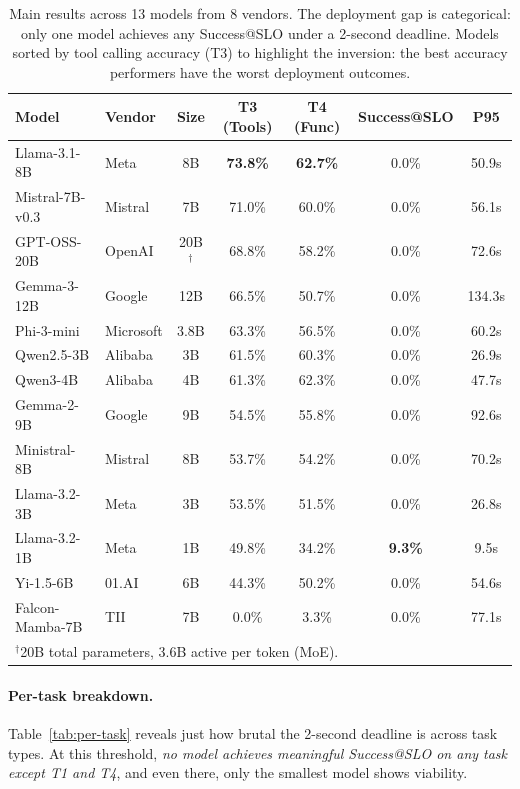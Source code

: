 \documentclass[11pt]{article}
\begin{document}
\begin{table}[t]
\centering
\caption{Main results across 13 models from 8 vendors.  The deployment gap is categorical: only one model achieves any Success@SLO under a 2-second deadline.  Models sorted by tool calling accuracy (T3) to highlight the inversion: the best accuracy performers have the worst deployment outcomes.}
\label{tab:main-results}
\small
\begin{tabular}{llccccc}
\toprule
\textbf{Model} & \textbf{Vendor} & \textbf{Size} & \textbf{T3 (Tools)} & \textbf{T4 (Func)} & \textbf{Success@SLO} & \textbf{P95} \\
\midrule
Llama-3.1-8B & Meta & 8B & \textbf{73.8\%} & \textbf{62.7\%} & 0.0\% & 50.9s \\
Mistral-7B-v0.3 & Mistral & 7B & 71.0\% & 60.0\% & 0.0\% & 56.1s \\
GPT-OSS-20B & OpenAI & 20B$^\dagger$ & 68.8\% & 58.2\% & 0.0\% & 72.6s \\
Gemma-3-12B & Google & 12B & 66.5\% & 50.7\% & 0.0\% & 134.3s \\
Phi-3-mini & Microsoft & 3.8B & 63.3\% & 56.5\% & 0.0\% & 60.2s \\
Qwen2.5-3B & Alibaba & 3B & 61.5\% & 60.3\% & 0.0\% & 26.9s \\
Qwen3-4B & Alibaba & 4B & 61.3\% & 62.3\% & 0.0\% & 47.7s \\
Gemma-2-9B & Google & 9B & 54.5\% & 55.8\% & 0.0\% & 92.6s \\
Ministral-8B & Mistral & 8B & 53.7\% & 54.2\% & 0.0\% & 70.2s \\
Llama-3.2-3B & Meta & 3B & 53.5\% & 51.5\% & 0.0\% & 26.8s \\
Llama-3.2-1B & Meta & 1B & 49.8\% & 34.2\% & \textbf{9.3\%} & 9.5s \\
Yi-1.5-6B & 01.AI & 6B & 44.3\% & 50.2\% & 0.0\% & 54.6s \\
Falcon-Mamba-7B & TII & 7B & 0.0\% & 3.3\% & 0.0\% & 77.1s \\
\bottomrule
\multicolumn{7}{l}{\footnotesize $^\dagger$20B total parameters, 3.6B active per token (MoE).} \\
\end{tabular}
\end{table}

\paragraph{Per-task breakdown.}
Table~\ref{tab:per-task} reveals just how brutal the 2-second deadline is across task types.
At this threshold, \emph{no model achieves meaningful Success@SLO on any task except T1 and T4}, and even there, only the smallest model shows viability.
\end{document}
